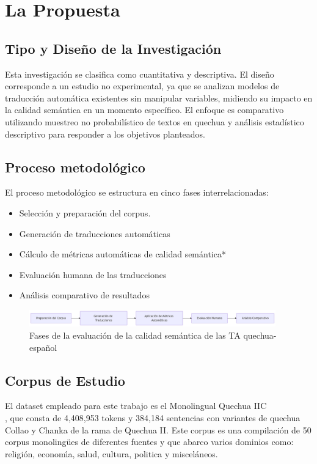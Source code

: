\chapter{ La Propuesta}

\section{Tipo y Diseño de la Investigación}

Esta investigación se clasifica como cuantitativa y descriptiva. El diseño corresponde a un estudio no experimental, ya que se analizan modelos de traducción automática existentes sin manipular variables, midiendo su impacto en la calidad semántica en un momento específico. El enfoque es comparativo utilizando muestreo no probabilístico de textos en quechua y análisis estadístico descriptivo para responder a los objetivos planteados.

\section{Proceso metodológico}
El proceso metodológico se estructura en cinco fases interrelacionadas:
\begin{itemize}
    \item Selección y preparación del corpus.
    \item Generación de traducciones automáticas
    \item Cálculo de métricas automáticas de calidad semántica*
    \item Evaluación humana de las traducciones
    \item Análisis comparativo de resultados    
\end{itemize}

\begin{figure}[htbp]
  \centering
  \includegraphics[width=0.95\textwidth]{figures/metodologia-fases.png}
  \caption{Fases de la evaluación de la calidad semántica de las TA quechua-español}
  \label{fig:mi_figura}
\end{figure}

    \section{Corpus de Estudio}
    
    El dataset empleado para este trabajo es el Monolingual Quechua IIC   \\
    \cite{zevallos2022}, que consta de 4,408,953
    tokens y 384,184 sentencias con variantes de quechua Collao y Chanka de la rama de Quechua II.
    Este corpus es una compilación de 50 corpus monolingües de diferentes fuentes y que abarco varios
    dominios como: religión, economı́a, salud, cultura, politica y misceláneos.
    
